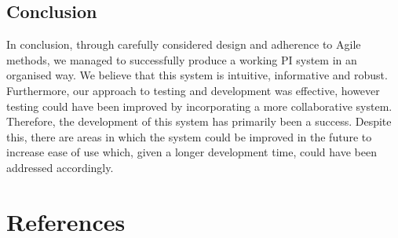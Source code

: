 \documentclass[11pt]{article}
\begin{document}
\subsection{Conclusion}

In conclusion, through carefully considered design and adherence to Agile
methods, we managed to successfully produce a working PI system in an organised
way. We believe that this system is intuitive, informative and robust.
Furthermore, our approach to testing and development was effective, however
testing could have been improved by incorporating a more collaborative system.
Therefore, the development of this system has primarily been a success.
Despite this, there are areas in which the system could be improved in the future
to increase ease of use which, given a longer development time, could have been
addressed accordingly.\par


\newpage
\section{References}
\end{document}
